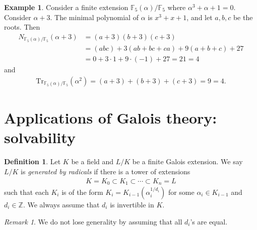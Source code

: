 \documentclass[12pt]{report}
\theoremstyle{plain}
\theoremstyle{remark}
\newtheorem*{remark}{Remark}
\theoremstyle{definition}
\newtheorem{definition}[theorem]{Definition}
\newtheorem{example}[theorem]{Example}
\newcommand{\Z}{\mathbb{Z}}
\begin{document}
\begin{example}
    Consider a finite extension $\mathbb{F}_5(\alpha)/\mathbb{F}_5$ where $\alpha^3+\alpha+1=0$. Consider $\alpha+3$. The minimal polynomial of $\alpha$ is $x^3+x+1$, and let $a,b,c$ be the roots. Then
    \begin{align*}
        N_{\mathbb{F}_5(\alpha)/\mathbb{F}_5}(\alpha+3) &= (a+3)(b+3)(c+3)\\ &= (abc)+3(ab+bc+ca)+9(a+b+c)+27\\ &= 0+3\cdot 1 + 9\cdot (-1) + 27 = 21 = 4
    \end{align*}
    and
    \begin{align*}
        \mathrm{Tr}_{\mathbb{F}_5(\alpha)/\mathbb{F}_5}(\alpha^2) = (a+3)+(b+3)+(c+3) = 9 = 4.
    \end{align*}
\end{example}


\clearpage
\section{Applications of Galois theory: solvability}

\begin{definition}
    Let $K$ be a field and $L/K$ be a finite Galois extension. We say $L/K$ is \emph{generated by radicals} if there is a tower of extensions
    \begin{align*}
        K=K_0\subset K_1\subset \cdots \subset K_n=L
    \end{align*}
    such that each $K_i$ is of the form $K_i=K_{i-1}(\alpha_i^{1/d_i})$ for some $\alpha_i\in K_{i-1}$ and $d_i\in\Z$. We always assume that $d_i$ is invertible in $K$.
\end{definition}
\begin{remark}
    We do not lose generality by assuming that all $d_i$'s are equal.
\end{remark}
\end{document}
